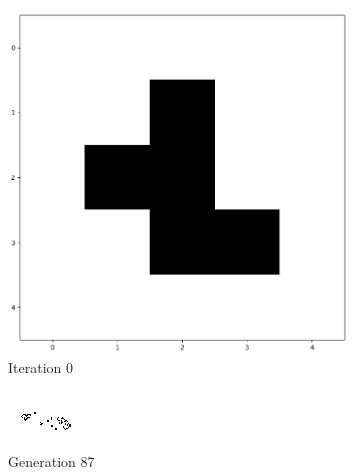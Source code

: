 \documentclass[../main.tex]{subfiles}
\begin{document}
\begin{figure}[H]
    \centering
    \begin{subfigure}{0.2\textwidth}
        \centering
        \includegraphics[width=\textwidth]{IMAGES/part2/StartConfigCGOF.png}
        \caption{Iteration 0}
		\label{fig:startconfigcgof}
    \end{subfigure}
    \hfill
    \begin{subfigure}{0.35\textwidth}
        \centering
        \includegraphics[width=\textwidth]{IMAGES/part2/CGOF_1.png}
        \caption{Generation 87}
    \end{subfigure}
    \hfill
    \begin{subfigure}{0.35\textwidth}

\end{subfigure}
\end{figure}
\end{document}

